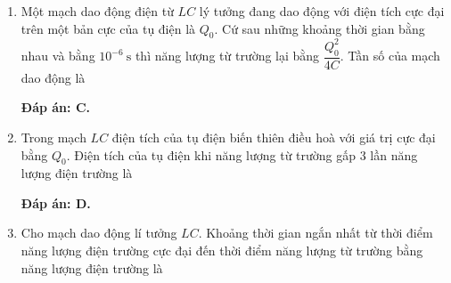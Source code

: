 \begin{enumerate}[label=\bfseries Câu \arabic*:]
{	}
		\item {}
	
	{
		Một mạch dao động điện từ $LC$ lý tưởng đang dao động với điện tích cực đại trên một bản cực của tụ điện là $Q_0$. Cứ sau những khoảng thời gian bằng nhau và bằng $10^{-6}\ \text{s}$ thì năng lượng từ trường lại bằng $\dfrac{Q_0^2}{4C}$. Tần số của mạch dao động là
		
	}
	
	\hideall
	{		\textbf{Đáp án: C.}
		
		
		
	}
		\item {}
	
	{
		Trong mạch $LC$ điện tích của tụ điện biến thiên điều hoà với giá trị cực đại bằng $Q_0$. Điện tích của tụ điện khi năng lượng từ trường gấp 3 lần năng lượng điện trường là
		
	}
	
	\hideall
	{		\textbf{Đáp án: D.}
		
		
		
	}
		\item {}
	
	{
		Cho mạch dao động lí tưởng $LC$. Khoảng thời gian ngắn nhất từ thời điểm năng lượng điện trường cực đại đến thời điểm năng lượng từ trường bằng năng lượng điện trường là
		
	}
	

\end{enumerate}
